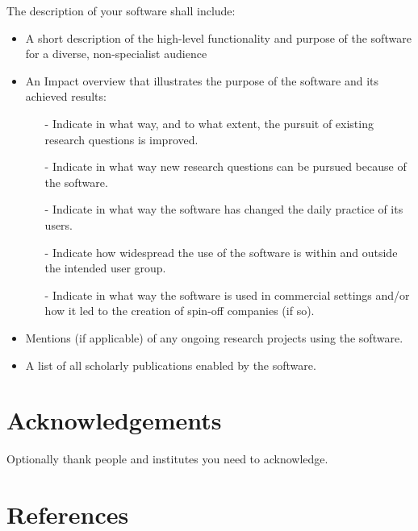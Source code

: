 \documentclass[preprint,12pt, a4paper]{elsarticle}
\begin{document}
\noindent
The description of your software  shall include:
\begin{itemize}
\item A short description of the high-level functionality and purpose of the software for a diverse, non-specialist audience
\item An Impact overview that illustrates the purpose of the software and its achieved results:
\begin{itemize}
\item[-] Indicate in what way, and to what extent, the pursuit of existing research questions is improved. 
\item[-] Indicate in what way new research questions can be pursued because of the software.
\item[-] Indicate in what way the software has changed the daily practice of its users.
\item[-] Indicate how widespread the use of the software is within and outside the intended user group.
\item[-] Indicate in what way the software is used in commercial settings and/or how it led to the creation of spin-off companies (if so).
\end{itemize}
\item Mentions (if applicable) of any ongoing research projects using the software. 
\item A list of all scholarly publications enabled by the software.
\end{itemize}
\section*{Acknowledgements}
\label{}

Optionally thank people and institutes you need to acknowledge. 
\section*{References}



\end{document}
